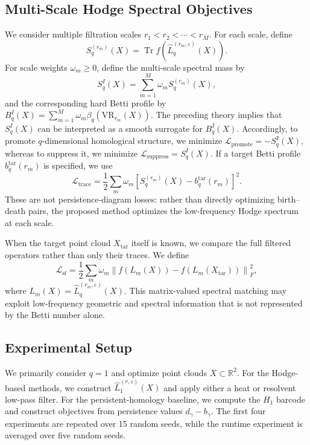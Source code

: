 \documentclass[pdflatex,sn-mathphys-num]{sn-jnl}%
\theoremstyle{thmstyleone}%
\theoremstyle{thmstyletwo}%
\theoremstyle{thmstylethree}%
\begin{document}
\subsection{Multi-Scale Hodge Spectral Objectives}

We consider multiple filtration scales
$r_1<r_2<\cdots<r_M$.
For each scale, define
\[
S_q^{(r_m)}(X)
=
\operatorname{Tr}
f\left(
\widehat L_q^{(r_m,\varepsilon)}(X)
\right).
\]
For scale weights \(\omega_m\ge0\), define the multi-scale spectral mass by
\[
S_q^I(X)
=
\sum_{m=1}^{M}
\omega_m
S_q^{(r_m)}(X),
\]
and the corresponding hard Betti profile by
$B_q^I(X)
=
\sum_{m=1}^{M}
\omega_m
\beta_q\left(
\mathrm{VR}_{r_m}(X)
\right)$.
The preceding theory implies that \(S_q^I(X)\) can be interpreted as a smooth surrogate for \(B_q^I(X)\).
Accordingly, to promote \(q\)-dimensional homological structure, we minimize
$\mathcal L_{\mathrm{promote}}
=
-S_q^I(X)$,
whereas to suppress it, we minimize
$\mathcal L_{\mathrm{suppress}}
=
S_q^I(X)$.
If a target Betti profile \(b_q^{\mathrm{tar}}(r_m)\) is specified, we use
\[
\mathcal L_{\mathrm{trace}}
=
\frac12
\sum_m
\omega_m
\left[
S_q^{(r_m)}(X)
-
b_q^{\mathrm{tar}}(r_m)
\right]^2.
\]
These are not persistence-diagram losses: rather than directly optimizing birth--death pairs, the proposed method optimizes the low-frequency Hodge spectrum at each scale.

When the target point cloud \(X_{\mathrm{tar}}\) itself is known, we compare the full filtered operators rather than only their traces.
We define
\[
\mathcal L_{\mathrm{sf}}
=
\frac12
\sum_m
\omega_m
\left\|
f(L_m(X))
-
f(L_m(X_{\mathrm{tar}}))
\right\|_F^2,
\]
where $L_m(X)
=
\widehat L_q^{(r_m,\varepsilon)}(X)$.
This matrix-valued spectral matching may exploit low-frequency geometric and spectral information that is not represented by the Betti number alone.


\subsection{Experimental Setup}

We primarily consider \(q=1\) and optimize point clouds
$X\subset\mathbb R^2$.
For the Hodge-based methods, we construct
\(\widehat L_1^{(r,\varepsilon)}(X)\)
and apply either a heat or resolvent low-pass filter.
For the persistent-homology baseline, we compute the \(H_1\) barcode and construct objectives from persistence values \(d_\gamma-b_\gamma\). The first four experiments are repeated over 15 random seeds, while the runtime experiment is averaged over five random seeds.
\end{document}
